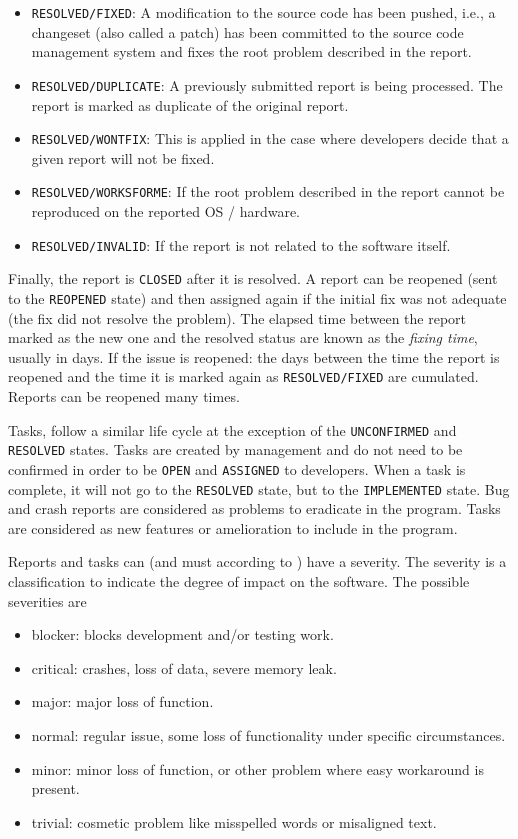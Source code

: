 \begin{itemize}
	\item {\tt RESOLVED/FIXED}: A modification to the source code has been pushed, i.e., a changeset (also called a patch) has been committed to the source code management system and fixes the root problem described in the report.
	\item {\tt RESOLVED/DUPLICATE}: A previously submitted report is being processed. The report is marked as duplicate of the original report.
	\item {\tt RESOLVED/WONTFIX}: This is applied in the case where developers decide that a given report will not be fixed.
	\item {\tt RESOLVED/WORKSFORME}: If the root problem described in the report cannot be reproduced on the reported OS / hardware.
	\item {\tt RESOLVED/INVALID}: If the report is not related to the software itself.
\end{itemize}

Finally, the report is {\tt CLOSED} after it is resolved.
A report can be reopened (sent to the {\tt REOPENED} state) and then assigned again if the initial fix was not adequate (the fix did not resolve the problem).
The elapsed time between the report marked as the new one and the resolved status are known as the {\it fixing time}, usually in days.
If the issue is reopened: the days between the time the report is reopened and the time it is marked again as {\tt RESOLVED/FIXED} are cumulated.
Reports can be reopened many times.

Tasks, follow a similar life cycle at the exception of the {\tt UNCONFIRMED} and {\tt RESOLVED} states.
Tasks are created by management and do not need to be confirmed in order to be {\tt OPEN} and {\tt ASSIGNED} to developers.
When a task is complete, it will not go to the {\tt RESOLVED} state, but to the {\tt IMPLEMENTED} state.
Bug and crash reports are considered as problems to eradicate in the program.
Tasks are considered as new features or amelioration to include in the program.

Reports and tasks can (and must according to \cite{Bettenburg2008}) have a severity.
The severity is a classification to indicate the degree of  impact on the software.
The possible severities are

\begin{itemize}
	\item blocker: blocks development and/or testing work.
	\item critical: crashes, loss of data, severe memory leak.
	\item major: major loss of function.
	\item normal: regular issue, some loss of functionality under
 specific circumstances.
  \item minor: minor loss of function, or other problem where easy workaround is present.
	\item trivial: cosmetic problem like misspelled words or misaligned text.
\end{itemize}

